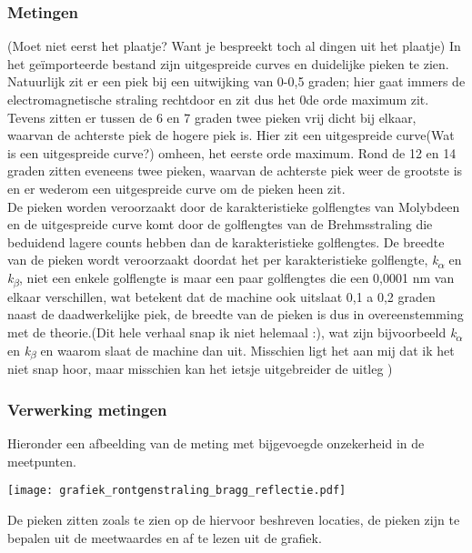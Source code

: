 \documentclass[a4paper]{article}
\begin{document}
\subsubsection{Metingen}
{\color{red}(Moet niet eerst het plaatje? Want je bespreekt toch al dingen uit het plaatje)}
 In het geïmporteerde bestand zijn uitgespreide curves en duidelijke pieken te zien. Natuurlijk zit er een piek bij een uitwijking van 0-0,5 graden;  hier gaat immers de electromagnetische straling rechtdoor en zit dus het 0de orde maximum zit. Tevens zitten er tussen de 6 en 7 graden twee pieken vrij dicht bij elkaar, waarvan de achterste piek de  hogere piek is. Hier zit een uitgespreide curve{\color{red}(Wat is een uitgespreide curve?)} omheen, het eerste orde maximum. Rond de 12 en 14 graden zitten eveneens twee pieken, waarvan de achterste piek weer de grootste is en er wederom een uitgespreide curve om de pieken heen zit.\\
 
 De pieken worden veroorzaakt door de karakteristieke golflengtes van Molybdeen en de uitgespreide curve komt door de golflengtes van de Brehmsstraling die beduidend lagere counts hebben dan de karakteristieke golflengtes. De breedte van de pieken wordt veroorzaakt doordat het per karakteristieke golflengte, \textit{k\textsubscript{$\alpha$}} en \textit{k\textsubscript{$\beta$}}, niet een enkele golflengte is maar een paar golflengtes die een 0,0001 nm van elkaar verschillen, wat betekent dat de machine ook uitslaat 0,1 a 0,2 graden naast de daadwerkelijke piek, de breedte van de pieken is dus in overeenstemming met de theorie.{\color{red}(Dit hele verhaal snap ik niet helemaal :), wat zijn bijvoorbeeld \textit{k\textsubscript{$\alpha$}} en \textit{k\textsubscript{$\beta$}} en waarom slaat de machine dan uit. Misschien ligt het aan mij dat ik het niet snap hoor, maar misschien kan het ietsje uitgebreider de uitleg )}\\
\subsubsection{Verwerking metingen}
 Hieronder een afbeelding van de meting met bijgevoegde onzekerheid in de meetpunten.
 \begin{center}
 \texttt{[image: grafiek\_rontgenstraling\_bragg\_reflectie.pdf]} %
 \end{center}
 De pieken zitten zoals te zien op de hiervoor beshreven locaties, de pieken zijn te bepalen uit de meetwaardes en af te lezen uit de grafiek. \\ 
 
\end{document}
